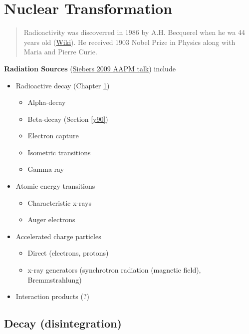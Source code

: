 \documentclass[]{book}
\providecommand{\tightlist}{%
  \setlength{\itemsep}{0pt}\setlength{\parskip}{0pt}}
\theoremstyle{definition}
\theoremstyle{definition}
\theoremstyle{definition}
\theoremstyle{remark}
\begin{document}
\chapter{Nuclear Transformation}\label{nut}

\begin{quote}
Radioactivity was discoverred in 1986 by A.H. Becquerel when he wa 44
years old (\href{https://en.wikipedia.org/wiki/Henri_Becquerel}{Wiki}).
He received 1903 Nobel Prize in Physics along with Maria and Pierre
Curie.
\end{quote}

\textbf{Radiation Sources} (\href{https://vimeo.com/78875937}{Siebers
2009 AAPM talk}) include

\begin{itemize}
\tightlist
\item
  Radioactive decay (Chapter \ref{nut})

  \begin{itemize}
  \tightlist
  \item
    Alpha-decay
  \item
    Beta-decay (Section \ref{y90})
  \item
    Electron capture
  \item
    Isometric transitions
  \item
    Gamma-ray
  \end{itemize}
\item
  Atomic energy transitions

  \begin{itemize}
  \tightlist
  \item
    Characteristic x-rays
  \item
    Auger electrons
  \end{itemize}
\item
  Accelerated charge particles

  \begin{itemize}
  \tightlist
  \item
    Direct (electrons, protons)
  \item
    x-ray generators (synchrotron radiation (magnetic field),
    Bremmstrahlung)
  \end{itemize}
\item
  Interaction products (?)
\end{itemize}

\section{Decay (disintegration)}\label{decays}
\end{document}
